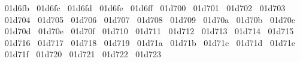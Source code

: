 {  ^^^^^^01d6fb%
  ^^^^^^01d6fc%
  ^^^^^^01d6fd%
  ^^^^^^01d6fe%
  ^^^^^^01d6ff%
  ^^^^^^01d700%
  ^^^^^^01d701%
  ^^^^^^01d702%
  ^^^^^^01d703%
  ^^^^^^01d704%
  ^^^^^^01d705%
  ^^^^^^01d706%
  ^^^^^^01d707%
  ^^^^^^01d708%
  ^^^^^^01d709%
  ^^^^^^01d70a%
  ^^^^^^01d70b%
  ^^^^^^01d70c%
  ^^^^^^01d70d%
  ^^^^^^01d70e%
  ^^^^^^01d70f%
  ^^^^^^01d710%
  ^^^^^^01d711%
  ^^^^^^01d712%
  ^^^^^^01d713%
  ^^^^^^01d714%
  ^^^^^^01d715%
  ^^^^^^01d716%
  ^^^^^^01d717%
  ^^^^^^01d718%
  ^^^^^^01d719%
  ^^^^^^01d71a%
  ^^^^^^01d71b%
  ^^^^^^01d71c%
  ^^^^^^01d71d%
  ^^^^^^01d71e%
  ^^^^^^01d71f%
  ^^^^^^01d720%
  ^^^^^^01d721%
  ^^^^^^01d722%
  ^^^^^^01d723%
}

